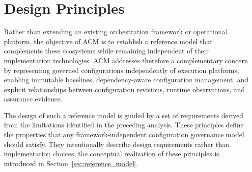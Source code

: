 \documentclass[10pt]{article}
\begin{document}
\section{Design Principles}
\label{sec:design_principles}

Rather than extending an existing orchestration framework or operational platform, the objective of ACM is to establish a reference model that complements these ecosystems while remaining independent of their implementation technologies. ACM addresses therefore a complementary concern by representing governed configurations independently of execution platforms, enabling immutable baselines, dependency-aware configuration management, and explicit relationships between configuration revisions, runtime observations, and assurance evidence.

The design of such a reference model is guided by a set of requirements derived from the limitations identified in the preceding analysis. These principles define the properties that any framework-independent configuration governance model should satisfy. They intentionally describe design requirements rather than implementation choices; the conceptual realization of these principles is introduced in Section~\ref{sec:reference_model}.
\end{document}

